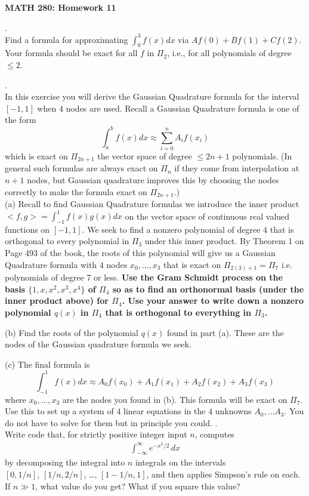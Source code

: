 \documentclass[12 pt]{article}
\begin{document}
\centerline{\bf MATH 280: Homework 11}

\bigskip

. \\ Find a formula for approximating $\int_{0}^3 f(x) dx$ 
via $Af(0) + Bf(1) + Cf(2)$. Your formula should be exact for all $f$ in $\Pi_2$, i.e., for all polynomials 
of degree $\leq 2$.

\medskip

. \\ In this exercise you will derive the Gaussian Quadrature formula for the interval $[-1,1]$ when $4$ nodes are used.
Recall a Gaussian Quadrature formula is one of the form 
$$
\int_a^b f(x) dx \approx \sum_{i=0}^n A_i f(x_i)
$$
which is exact on $\Pi_{2n+1}$ the vector space of degree $\leq 2n+1$ polynomials. (In general such formulas are always exact on $\Pi_n$ if 
they come from interpolation at $n+1$ nodes, but Gaussian quadrature improves this by choosing the nodes correctly to make the formula exact on $\Pi_{2n+1}$.) \\
(a) Recall to find Gaussian Quadrature formulas we introduce the inner product 
$<f,g> = \int_{-1}^1 f(x) g(x) dx$ on the vector space of continuous real valued functions on $[-1,1]$. We seek to find a nonzero polynomial 
of degree $4$ that is orthogonal to every polynomial in $\Pi_3$ under this inner product. By Theorem 1 on Page 493 of the book, the roots of this polynomial will 
give us a Gaussian Quadrature formula with $4$ nodes $x_0, \dots, x_3$ that is exact on $\Pi_{2(3)+1}=\Pi_7$ i.e. polynomials of degree 7 or less. 
{\bf Use the Gram Schmidt process on the basis $\{1,x, x^2, x^3, x^4\}$ of $\Pi_4$ so as to find an orthonormal basis (under the inner product above) for 
$\Pi_4$. Use your answer to write down a nonzero polynomial $q(x)$ in $\Pi_4$ that is orthogonal to everything in $\Pi_3$.}

\noindent
(b) Find the roots of the polynomial $q(x)$ found in part (a). These are the nodes of the Gaussian quadrature formula we seek. 

\noindent
(c) The final formula is 
$$
\int_{-1}^{1} f(x) dx \approx A_0f(x_0) + A_1f(x_1) + A_2f(x_2) + A_3f(x_3)
$$
where $x_0, \dots, x_3$ are the nodes you found in (b). This formula will be exact on $\Pi_7$. Use this to set up a system of $4$ linear equations 
in the $4$ unknowns $A_0, \dots A_3$. You do not have to solve for them but in principle you could. 
\newpage
{}. \\
Write code that, for strictly positive integer input $n$, computes 
\begin{align*}
\int_{-\infty}^{\infty} e^{-x^2/2} \, dx 
\end{align*}
by decomposing the integral into $n$ integrals on the intervals
\\ $[0,1/n]$, $[1/n, 2/n]$, \ldots,
$[1-1/n, 1]$, and then applies Simpson's rule on each. If $n
\gg 1$, what value do you get? What if you square this value?
\end{document}
